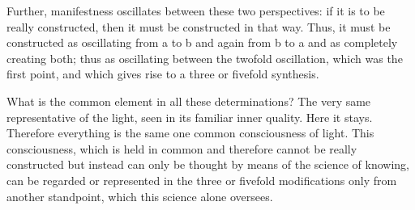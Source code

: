 Further, manifestness oscillates
between these two perspectives:
if it is to be really constructed,
then it must be constructed in that way.
Thus, it must be constructed as oscillating
from a to b and again from b to a and
as completely creating both;
thus as oscillating between the twofold oscillation,
which was the first point,
and which gives rise to a three or fivefold synthesis.

What is the common element in all these determinations?
The very same representative of the light,
seen in its familiar inner quality.
Here it stays.
Therefore everything is the same one common consciousness of light.
This consciousness, which is held in common
and therefore cannot be really constructed
but instead can only be thought by means of the science of knowing,
can be regarded or represented in the three or fivefold modifications only
from another standpoint, which this science alone oversees.
